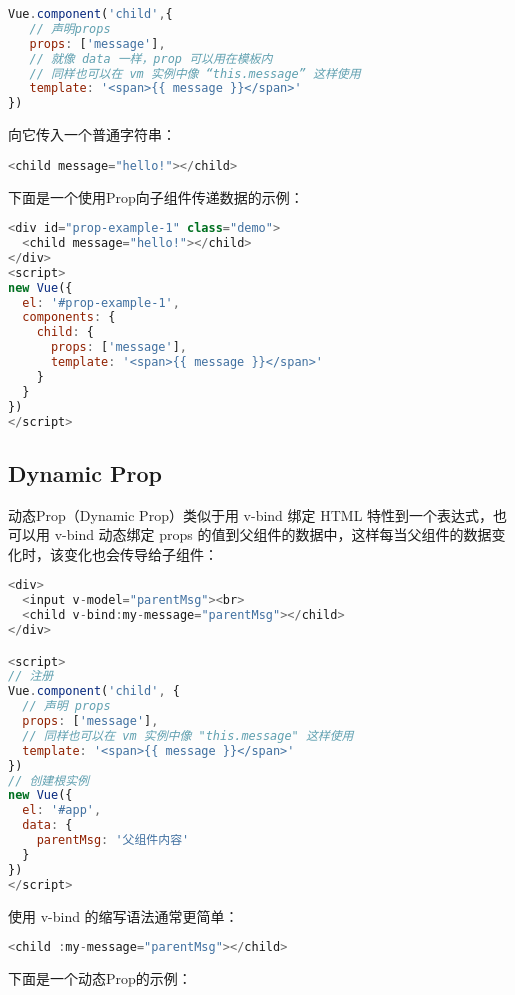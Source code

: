 \begin{lstlisting}[language=JavaScript]
Vue.component('child',{
   // 声明props
   props: ['message'],
   // 就像 data 一样，prop 可以用在模板内
   // 同样也可以在 vm 实例中像 “this.message” 这样使用
   template: '<span>{{ message }}</span>'
})
\end{lstlisting}

向它传入一个普通字符串：

\begin{lstlisting}[language=JavaScript]
<child message="hello!"></child>
\end{lstlisting}

下面是一个使用Prop向子组件传递数据的示例：

\begin{lstlisting}[language=JavaScript]
<div id="prop-example-1" class="demo">
  <child message="hello!"></child>
</div>
<script>
new Vue({
  el: '#prop-example-1',
  components: {
    child: {
      props: ['message'],
      template: '<span>{{ message }}</span>'
    }
  }
})
</script>
\end{lstlisting}


\subsection{Dynamic Prop}



动态Prop（Dynamic Prop）类似于用 v-bind 绑定 HTML 特性到一个表达式，也可以用 v-bind 动态绑定 props 的值到父组件的数据中，这样每当父组件的数据变化时，该变化也会传导给子组件：

\begin{lstlisting}[language=JavaScript]
<div>
  <input v-model="parentMsg"><br>
  <child v-bind:my-message="parentMsg"></child>
</div>

<script>
// 注册
Vue.component('child', {
  // 声明 props
  props: ['message'],
  // 同样也可以在 vm 实例中像 "this.message" 这样使用
  template: '<span>{{ message }}</span>'
})
// 创建根实例
new Vue({
  el: '#app',
  data: {
    parentMsg: '父组件内容'
  }
})
</script>
\end{lstlisting}

使用 v-bind 的缩写语法通常更简单：

\begin{lstlisting}[language=JavaScript]
<child :my-message="parentMsg"></child>
\end{lstlisting}

下面是一个动态Prop的示例：

